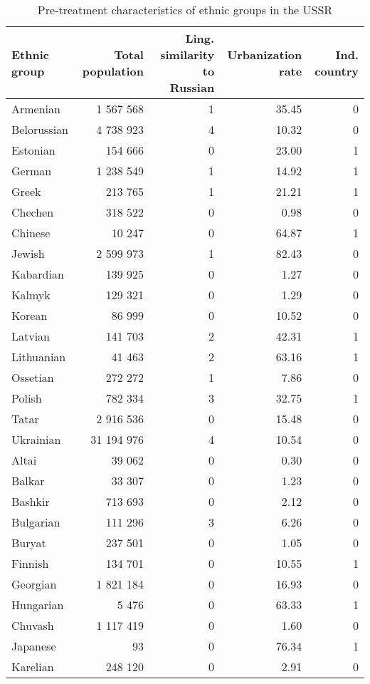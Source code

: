 \begin{table}[t]

\caption{\label{tab:sc_predictors}Pre-treatment characteristics of ethnic groups in the USSR}
\centering
\begin{threeparttable}
\begin{tabular}{lrrrr}
\toprule
Ethnic group & Total population & Ling. similarity to Russian & Urbanization rate & Ind. country\\
\midrule
Armenian & 1 567 568 & 1 & 35.45 & 0\\
Belorussian & 4 738 923 & 4 & 10.32 & 0\\
Estonian & 154 666 & 0 & 23.00 & 1\\
German & 1 238 549 & 1 & 14.92 & 1\\
Greek & 213 765 & 1 & 21.21 & 1\\
Chechen & 318 522 & 0 & 0.98 & 0\\
Chinese & 10 247 & 0 & 64.87 & 1\\
Jewish & 2 599 973 & 1 & 82.43 & 0\\
Kabardian & 139 925 & 0 & 1.27 & 0\\
Kalmyk & 129 321 & 0 & 1.29 & 0\\
Korean & 86 999 & 0 & 10.52 & 0\\
Latvian & 141 703 & 2 & 42.31 & 1\\
Lithuanian & 41 463 & 2 & 63.16 & 1\\
Ossetian & 272 272 & 1 & 7.86 & 0\\
Polish & 782 334 & 3 & 32.75 & 1\\
Tatar & 2 916 536 & 0 & 15.48 & 0\\
Ukrainian & 31 194 976 & 4 & 10.54 & 0\\
Altai & 39 062 & 0 & 0.30 & 0\\
Balkar & 33 307 & 0 & 1.23 & 0\\
Bashkir & 713 693 & 0 & 2.12 & 0\\
Bulgarian & 111 296 & 3 & 6.26 & 0\\
Buryat & 237 501 & 0 & 1.05 & 0\\
Finnish & 134 701 & 0 & 10.55 & 1\\
Georgian & 1 821 184 & 0 & 16.93 & 0\\
Hungarian & 5 476 & 0 & 63.33 & 1\\
Chuvash & 1 117 419 & 0 & 1.60 & 0\\
Japanese & 93 & 0 & 76.34 & 1\\
Karelian & 248 120 & 0 & 2.91 & 0\\

\end{tabular}
\end{threeparttable}
\end{table}
